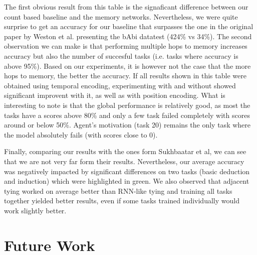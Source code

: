 \documentclass[twoside,11pt]{article}
\begin{document}
\noindent The first obvious result from this table is the signaficant difference between our count based baseline and the memory networks. Nevertheless, we were quite surprise to get an accuracy for our baseline that surpasses the one in the original paper by Weston et al. presenting the bAbi datatest (424\% vs 34\%). The second observation we can make is that performing multiple hops to memory increases accuracy but also the number of succesful tasks (i.e. tasks where accuracy is above 95\%). Based on our experiments, it is however not the case that the more hops to memory, the better the accuracy. If all results shown in this table were obtained using temporal encoding, experimenting with and without showed significant improvent with it, as well as with position encoding. What is interesting to note is that the global performance is relatively good, as most the tasks have a scores above 80\% and only a few task failed completely with scores around or below 50\%. Agent's motivation (task 20) remains the only task where the model absolutely fails (with scores close to 0). 

\noindent Finally, comparing our results with the ones form Sukhbaatar et al, we can see that we are not very far form their results. Nevertheless, our average accuracy was negatively impacted by significant differences on two tasks (basic deduction and induction) which were highlighted in green. We also observed that adjacent tying worked on average better than RNN-like tying and training all tasks together yielded better results, even if some tasks trained individually would work slightly better.

\section{Future Work}
\end{document}
